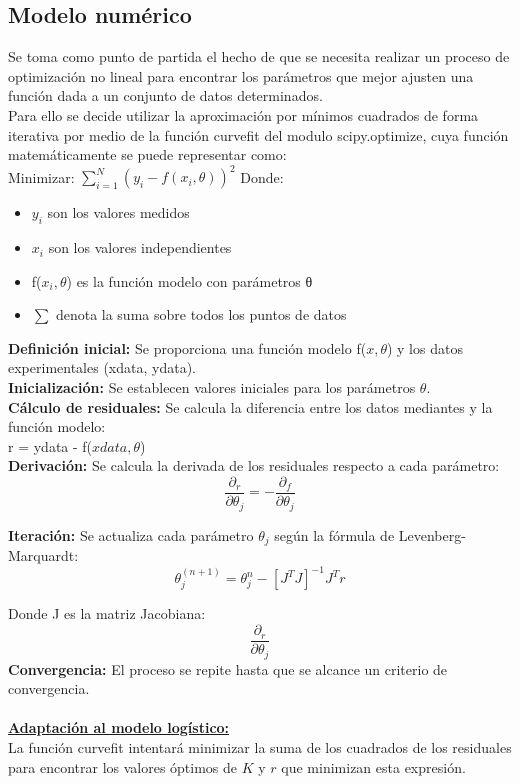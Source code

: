\documentclass[a4paper,10pt,twocolumn]{article}
\begin{document}
	\subsection{Modelo numérico}\label{sub:num}
Se toma como punto de partida el hecho de que se necesita realizar un proceso de optimización no lineal para encontrar los parámetros que mejor ajusten una función dada a un conjunto de datos determinados.\\ 
Para ello se decide utilizar la aproximación por mínimos cuadrados de forma iterativa por medio de la función  curvefit del modulo scipy.optimize, cuya función matemáticamente se puede representar como:\\
Minimizar: $\sum_{i=1}^{N} (y_{i} - f(x_{i}, \theta))^2 $ 
Donde:\\
\begin{itemize}
	\item $y_{i}$ son los valores medidos
	\item $x_{i}$ son los valores independientes
	\item f($x_{i}, \theta$) es la función modelo con parámetros θ
	\item	$\sum$ denota la suma sobre todos los puntos de datos
\end{itemize}

\textbf{Definición inicial:} Se proporciona una función modelo f($x, \theta$) y los datos experimentales (xdata, ydata).\\
\textbf{Inicialización:} Se establecen valores iniciales para los parámetros $\theta$.\\
\textbf{Cálculo de residuales:} Se calcula la diferencia entre los datos mediantes y la función modelo:\\ r = ydata - f($xdata, \theta$)\\
\textbf{Derivación:} Se calcula la derivada de los residuales respecto a cada parámetro:\\
$$	\frac{\partial_{r}}{\partial \theta_{j}} = -\frac{\partial_{f}}{\partial \theta_{j}} $$

\textbf{Iteración:} Se actualiza cada parámetro $\theta_{j}$ según la fórmula de Levenberg-Marquardt:\\
$$\theta_{j}^{(n+1)} = \theta_{j}^{n} - [J^{T} J]^{-1} J^{T} r $$

Donde J es la matriz Jacobiana: $$\frac{\partial_{r}}{\partial \theta_{j}}$$
\textbf{Convergencia:} El proceso se repite hasta que se alcance un criterio de convergencia.\\ \\
\underline{\large{\textbf{Adaptación al modelo logístico: }}}\\
La función curvefit intentará minimizar la suma de los cuadrados de los residuales para encontrar los valores óptimos de $K$ y $r$ que minimizan esta expresión. 
\end{document}
